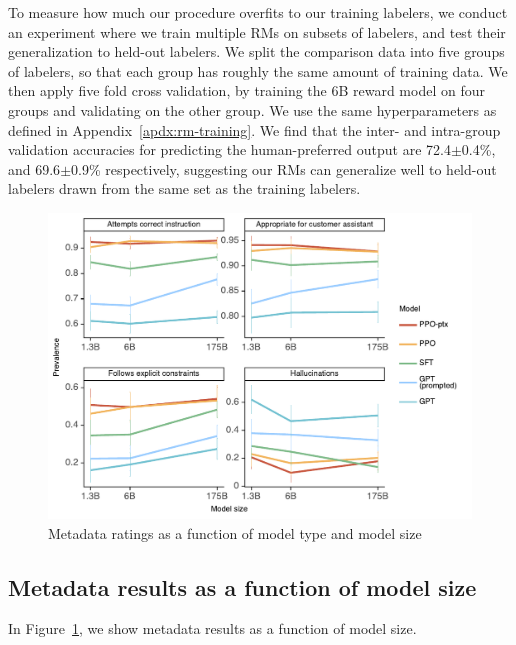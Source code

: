 \documentclass{article}
\begin{document}
To measure how much our procedure overfits to our training labelers, we conduct an experiment where we train multiple RMs on subsets of labelers, and test their generalization to held-out labelers.
We split the comparison data into five groups of labelers, so that each group has roughly the same amount of training data. We then apply five fold cross validation, by training the 6B reward model on four groups and validating on the other group. We use the same hyperparameters as defined in Appendix~\ref{apdx:rm-training}. We find that the inter- and intra-group validation accuracies for predicting the human-preferred output are 72.4$\pm$0.4\%, and 69.6$\pm$0.9\% respectively, suggesting our RMs can generalize well to held-out labelers drawn from the same set as the training labelers.




\label{apdx:metadata-with-model-size}
\begin{figure}
    \centering
    \includegraphics[width=\linewidth]{figs/metadata-with-model-size.pdf}
    \caption{Metadata ratings as a function of model type and model size}
    \label{fig:metadata-with-model-size}
\end{figure}

\subsection{Metadata results as a function of model size}

In Figure~\ref{fig:metadata-with-model-size}, we show metadata results as a function of model size.
\end{document}
